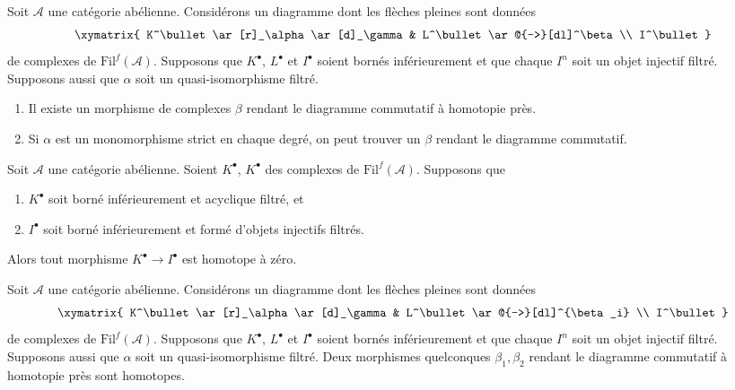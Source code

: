 \begin{exercise}
\label{exercise-morphisms-lift}
Soit $\mathcal{A}$ une catégorie abélienne.
Considérons un diagramme dont les flèches pleines sont données
$$
\xymatrix{
K^\bullet \ar[r]_\alpha \ar[d]_\gamma & L^\bullet \ar@{-->}[dl]^\beta \\
I^\bullet
}
$$
de complexes de $\text{Fil}^f(\mathcal{A})$. Supposons que
$K^\bullet$, $L^\bullet$ et $I^\bullet$ soient bornés inférieurement et que
chaque $I^n$ soit un objet injectif filtré.
Supposons aussi que $\alpha$ soit un quasi-isomorphisme filtré.
\begin{enumerate}
\item Il existe un morphisme de complexes $\beta$ rendant le diagramme
commutatif à homotopie près.
\item Si $\alpha$ est un monomorphisme strict en chaque degré,
on peut trouver un $\beta$ rendant le diagramme commutatif.
\end{enumerate}
\end{exercise}

\begin{exercise}
\label{exercise-acyclic-is-zero}
Soit $\mathcal{A}$ une catégorie abélienne.
Soient $K^\bullet$, $K^\bullet$ des complexes de $\text{Fil}^f(\mathcal{A})$.
Supposons que
\begin{enumerate}
\item $K^\bullet$ soit borné inférieurement et acyclique filtré, et
\item $I^\bullet$ soit borné inférieurement et formé d'objets injectifs filtrés.
\end{enumerate}
Alors tout morphisme $K^\bullet \to I^\bullet$ est homotope à zéro.
\end{exercise}

\begin{exercise}
\label{exercise-morphisms-equal-up-to-homotopy}
Soit $\mathcal{A}$ une catégorie abélienne.
Considérons un diagramme dont les flèches pleines sont données
$$
\xymatrix{
K^\bullet \ar[r]_\alpha \ar[d]_\gamma & L^\bullet \ar@{-->}[dl]^{\beta_i} \\
I^\bullet
}
$$
de complexes de $\text{Fil}^f(\mathcal{A})$.
Supposons que $K^\bullet$, $L^\bullet$ et $I^\bullet$ soient bornés inférieurement et que
chaque $I^n$ soit un objet injectif
filtré. Supposons aussi que $\alpha$ soit un quasi-isomorphisme filtré.
Deux morphismes quelconques $\beta_1, \beta_2$ rendant le diagramme commutatif
à homotopie près sont homotopes.
\end{exercise}







